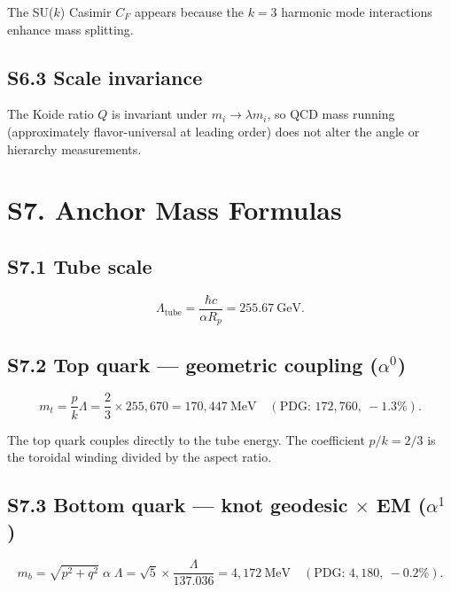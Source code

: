 \documentclass[11pt,a4paper]{article}
\begin{document}
The SU($k$) Casimir $C_F$ appears because the $k=3$ harmonic mode interactions enhance mass splitting.

\subsection{S6.3 Scale invariance}

The Koide ratio $Q$ is invariant under $m_i \to \lambda m_i$, so QCD mass running (approximately flavor-universal at leading order) does not alter the angle or hierarchy measurements.

\section{S7. Anchor Mass Formulas}
\label{sec:S7}

\subsection{S7.1 Tube scale}

\begin{equation}
  \Lambda_{\text{tube}} = \frac{\hbar c}{\alpha R_p} = 255.67~\text{GeV}.
\end{equation}

\subsection{S7.2 Top quark --- geometric coupling \texorpdfstring{($\alpha^0$)}{(alpha0)}}

\begin{equation}
  m_t = \frac{p}{k}\Lambda = \frac{2}{3} \times 255{,}670 = 170{,}447~\text{MeV} \quad (\text{PDG: } 172{,}760,\ -1.3\%).
\end{equation}

The top quark couples directly to the tube energy. The coefficient $p/k = 2/3$ is the toroidal winding divided by the aspect ratio.

\subsection{S7.3 Bottom quark --- knot geodesic \texorpdfstring{$\times$}{x} EM \texorpdfstring{($\alpha^1$)}{(alpha1)}}

\begin{equation}
  m_b = \sqrt{p^2+q^2}\;\alpha\;\Lambda = \sqrt{5} \times \frac{\Lambda}{137.036} = 4{,}172~\text{MeV} \quad (\text{PDG: } 4{,}180,\ -0.2\%).
\end{equation}
\end{document}
